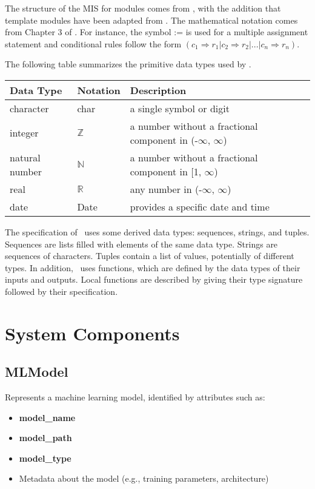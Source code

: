 \documentclass[12pt, titlepage]{article}
\begin{document}

The structure of the MIS for modules comes from \citet{HoffmanAndStrooper1995},
with the addition that template modules have been adapted from
\cite{GhezziEtAl2003}.  The mathematical notation comes from Chapter 3 of
\citet{HoffmanAndStrooper1995}.  For instance, the symbol := is used for a
multiple assignment statement and conditional rules follow the form $(c_1
\Rightarrow r_1 | c_2 \Rightarrow r_2 | ... | c_n \Rightarrow r_n )$.

The following table summarizes the primitive data types used by \progname. 

\begin{center}
\renewcommand{\arraystretch}{1.2}
\noindent 
\begin{tabular}{l l p{7.5cm}} 
\toprule 
\textbf{Data Type} & \textbf{Notation} & \textbf{Description}\\ 
\midrule
character & char & a single symbol or digit\\
integer & $\mathbb{Z}$ & a number without a fractional component in (-$\infty$, $\infty$) \\
natural number & $\mathbb{N}$ & a number without a fractional component in [1, $\infty$) \\
real & $\mathbb{R}$ & any number in (-$\infty$, $\infty$)\\
date & Date & provides a specific date and time\\
\bottomrule
\end{tabular} 
\end{center}

\noindent
The specification of \progname \ uses some derived data types: sequences, strings, and
tuples. Sequences are lists filled with elements of the same data type. Strings
are sequences of characters. Tuples contain a list of values, potentially of
different types. In addition, \progname \ uses functions, which
are defined by the data types of their inputs and outputs. Local functions are
described by giving their type signature followed by their specification.

\section*{System Components}

\subsection*{MLModel}
Represents a machine learning model, identified by attributes such as:
\begin{itemize}
    \item \textbf{model\_name}
    \item \textbf{model\_path}
    \item \textbf{model\_type}
    \item Metadata about the model (e.g., training parameters, architecture)
\end{itemize}
\end{document}

